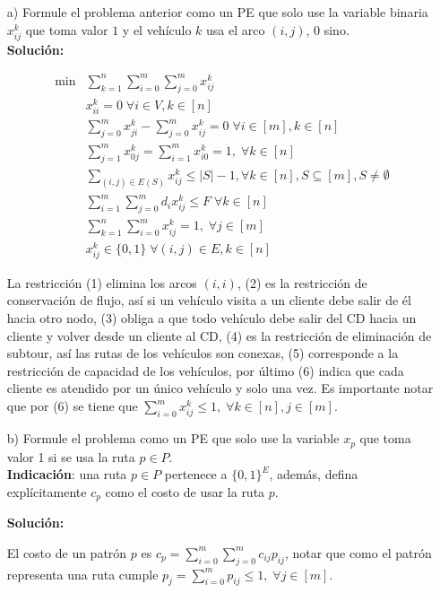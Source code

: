 \documentclass[10pt]{article}
\theoremstyle{plain}
\theoremstyle{definition}
\begin{document}
\begin{itemize}
\item[a)] Formule el problema anterior como un PE que solo use la variable binaria $x_{ij}^{k}$ que toma valor $1$ y el vehículo $k$ usa el arco $(i,j)$, 0 sino.\\

\textbf{Solución:}

\begin{align}
\min &\sum_{k=1}^{n}\sum_{i=0}^{m}\sum_{j=0}^{m} x_{ij}^{k}\nonumber\\ 
& x_{ii}^{k}=0 \; \forall i \in V, k \in [n]\\
& \sum_{j=0}^{m}x_{ji}^{k} - \sum_{j=0}^{m}x_{ij}^{k} = 0\; \forall i \in [m], k \in [n]\\
& \sum_{j=1}^{m}x_{0j}^{k}=\sum_{i=1}^{m}x_{i0}^{k}=1, \; \forall k \in [n]\\
& \sum_{(i,j)\in E(S)}x_{ij}^{k}\leq |S|-1, \forall k\in[n], S\subseteq [m], S\neq\emptyset\\
& \sum_{i=1}^{m}\sum_{j=0}^{m} d_{i}x_{ij}^{k}\leq F \; \forall k \in [n]\\
& \sum_{k=1}^{n}\sum_{i=0}^{m} x_{ij}^{k} = 1, \;\forall j \in [m]\\
& x_{ij}^{k}\in\{0,1\} \; \forall (i,j)\in E, k \in [n]\nonumber
\end{align}

La restricción (1) elimina los arcos $(i,i)$, (2) es la restricción de conservación de flujo, así si un vehículo visita a un cliente debe salir de él hacia otro nodo, (3) obliga a que todo vehículo debe salir del CD hacia un cliente y volver desde un cliente al CD, (4) es la restricción de eliminación de subtour, así las rutas de los vehículos son conexas, (5) corresponde a la restricción de capacidad de los vehículos, por último (6) indica que cada cliente es atendido por un único vehículo y solo una vez. Es importante notar que por (6) se tiene que $\sum_{i=0}^{m}x_{ij}^{k}\leq 1, \; \forall k \in [n], j \in [m]$.

\item[b)] Formule el problema como un PE que solo use la variable $x_{p}$ que toma valor 1 si se usa la ruta $p\in P$.\\ \textbf{Indicación}: una ruta $p\in P$ pertenece a $\{0,1\}^{E}$, además, defina explícitamente $c_{p}$ como el costo de usar la ruta $p$.

\textbf{Solución:}

El costo de un patrón $p$ es $c_{p}=\sum_{i=0}^{m}\sum_{j=0}^{m}c_{ij}p_{ij}$, notar que como el patrón representa una ruta cumple $p_{j}=\sum_{i=0}^{m}p_{ij}\leq 1, \;\forall j \in [m]$.


\end{itemize}
\end{document}
